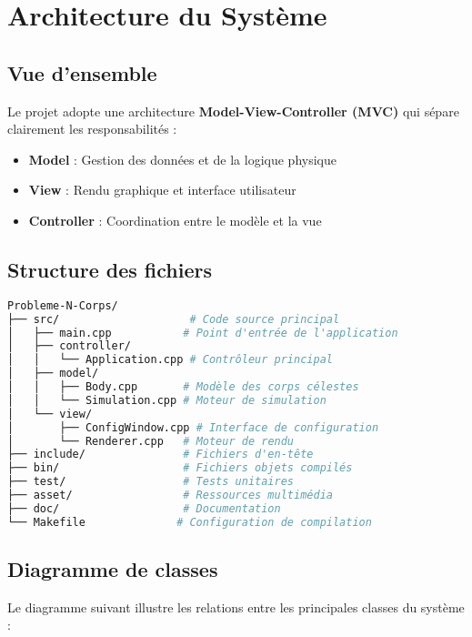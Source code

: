 \documentclass[12pt,a4paper]{article}
\begin{document}
\section{Architecture du Système}

\subsection{Vue d'ensemble}

Le projet adopte une architecture \textbf{Model-View-Controller (MVC)} qui sépare clairement les responsabilités :

\begin{itemize}
    \item \textbf{Model} : Gestion des données et de la logique physique
    \item \textbf{View} : Rendu graphique et interface utilisateur
    \item \textbf{Controller} : Coordination entre le modèle et la vue
\end{itemize}

\subsection{Structure des fichiers}

\begin{lstlisting}[language=bash, caption=Structure du projet]
Probleme-N-Corps/
├── src/                    # Code source principal
│   ├── main.cpp           # Point d'entrée de l'application
│   ├── controller/
│   │   └── Application.cpp # Contrôleur principal
│   ├── model/
│   │   ├── Body.cpp       # Modèle des corps célestes
│   │   └── Simulation.cpp # Moteur de simulation
│   └── view/
│       ├── ConfigWindow.cpp # Interface de configuration
│       └── Renderer.cpp   # Moteur de rendu
├── include/               # Fichiers d'en-tête
├── bin/                   # Fichiers objets compilés
├── test/                  # Tests unitaires
├── asset/                 # Ressources multimédia
├── doc/                   # Documentation
└── Makefile              # Configuration de compilation
\end{lstlisting}

\subsection{Diagramme de classes}

Le diagramme suivant illustre les relations entre les principales classes du système :
\end{document}
